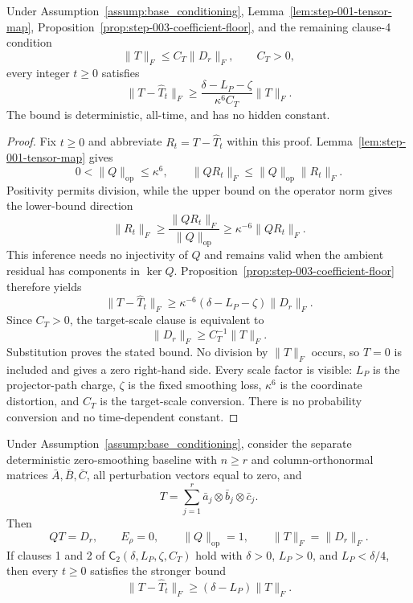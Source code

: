 \begin{proposition}
\label{prop:step-003-ambient-floor}
Under Assumption~\ref{assump:base_conditioning},
Lemma~\ref{lem:step-001-tensor-map},
Proposition~\ref{prop:step-003-coefficient-floor}, and the remaining
clause-4 condition
\[
\|T\|_F\leq C_T\|D_r\|_F,
\qquad C_T>0,
\]
every integer $t\geq0$ satisfies
\[
\|T-\widehat T_t\|_F
\geq
\frac{\delta-L_P-\zeta}{\kappa^6C_T}\|T\|_F.
\]
The bound is deterministic, all-time, and has no hidden constant.
\end{proposition}

\begin{proof}
Fix $t\geq0$ and abbreviate $R_t=T-\widehat T_t$ within this proof.
Lemma~\ref{lem:step-001-tensor-map} gives
\[
0<\|Q\|_{\mathrm{op}}\leq\kappa^6,
\qquad
\|QR_t\|_F\leq\|Q\|_{\mathrm{op}}\|R_t\|_F.
\]
Positivity permits division, while the upper bound on the operator norm gives
the lower-bound direction
\[
\|R_t\|_F
\geq\frac{\|QR_t\|_F}{\|Q\|_{\mathrm{op}}}
\geq\kappa^{-6}\|QR_t\|_F.
\]
This inference needs no injectivity of $Q$ and remains valid when the ambient
residual has components in $\ker Q$.  Proposition~\ref{prop:step-003-coefficient-floor}
therefore yields
\[
\|T-\widehat T_t\|_F
\geq\kappa^{-6}(\delta-L_P-\zeta)\|D_r\|_F.
\]
Since $C_T>0$, the target-scale clause is equivalent to
\[
\|D_r\|_F\geq C_T^{-1}\|T\|_F.
\]
Substitution proves the stated bound.  No division by $\|T\|_F$ occurs, so
$T=0$ is included and gives a zero right-hand side.  Every scale factor is
visible: $L_P$ is the projector-path charge, $\zeta$ is the fixed smoothing
loss, $\kappa^6$ is the coordinate distortion, and $C_T$ is the target-scale
conversion.  There is no probability conversion and no time-dependent
constant.
\end{proof}

\begin{proposition}
\label{prop:step-003-baseline-floor}
Under Assumption~\ref{assump:base_conditioning}, consider the separate
deterministic zero-smoothing baseline with $n\geq r$ and column-orthonormal
matrices
$\bar A,\bar B,\bar C$, all perturbation vectors equal to zero, and
\[
T=\sum_{j=1}^r\bar a_j\otimes\bar b_j\otimes\bar c_j.
\]
Then
\[
QT=D_r,
\qquad E_\rho=0,
\qquad \|Q\|_{\mathrm{op}}=1,
\qquad \|T\|_F=\|D_r\|_F.
\]
If clauses 1 and 2 of $\mathsf C_2(\delta,L_P,\zeta,C_T)$ hold with
$\delta>0$, $L_P>0$, and $L_P<\delta/4$, then every $t\geq0$ satisfies
the stronger bound
\[
\|T-\widehat T_t\|_F\geq(\delta-L_P)\|T\|_F.
\]
\end{proposition}

